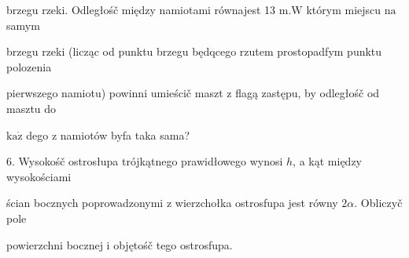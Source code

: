 \documentclass[a4paper,12pt]{article}
\begin{document}
brzegu rzeki. Odległośč między namiotami równajest 13 $\mathrm{m}. \mathrm{W}$ którym miejscu $\mathrm{n}\mathrm{a}$ samym

brzegu rzeki (licząc od punktu brzegu będqcego rzutem prostopadfym punktu polozenia

pierwszego namiotu) powinni umieścič maszt $\mathrm{z}$ flagą zastępu, by odległośč od masztu do

$\mathrm{k}\mathrm{a}\dot{\mathrm{z}}$ dego $\mathrm{z}$ namiotów byfa taka sama?

6. Wysokośč ostrosłupa trójkątnego prawidłowego wynosi $h$, a kąt między wysokościami

ścian bocznych poprowadzonymi $\mathrm{z}$ wierzchołka ostrosfupa jest równy $ 2\alpha$. Obliczyč pole

powierzchni bocznej $\mathrm{i}$ objętośč tego ostrosfupa.
\end{document}

